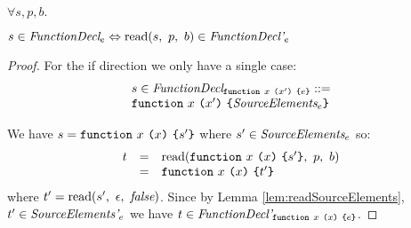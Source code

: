 \documentclass[onecolumn]{sigplanconf-onecolumn}
\begin{document}
\begin{lemma}\mbox{}
  
  \( \forall s, p, b. \)

  \( s \in \textit{FunctionDecl}_{e} \Leftrightarrow 
  \textrm{read}(s,~p,~b) \in \textit{FunctionDecl'}_{e} \)
\end{lemma}
\begin{proof}
  For the if direction we only have a single case: 
  \[ 
  \begin{array}{lcl}
  s \in
  \textit{FunctionDecl}_{\texttt{function}~x~\texttt{(}x'\texttt{)}~\texttt{\{}e\texttt{\}}}
  ::= 
  \\
  \texttt{function}~x~\texttt{(}x'\texttt{)}~\texttt{\{}\textit{SourceElements}_{e}\texttt{\}}
  \end{array}
  \]

 We have \( s = \texttt{function}~x~\texttt{(}x\texttt{)}~\texttt{\{}s'\texttt{\}}
 \) where \( s' \in \textit{SourceElements}_{e} \) so:
 \[
 \begin{array}{rcl}
   t &=& \textrm{read}(\texttt{function}~x~\texttt{(}x\texttt{)}~\texttt{\{}s'\texttt{\}},~p,~b)
   \\
   &=& \texttt{function}~x~\texttt{(}x\texttt{)}~\texttt{\{}t'\texttt{\}}
 \end{array}
 \]
 where \( t' = \textrm{read}(s',~\epsilon,~\textit{false}) \). 
 Since by Lemma \ref{lem:readSourceElements},
 \( t' \in \textit{SourceElements'}_{e} \) we have \( t \in \textit{FunctionDecl'}_{\texttt{function}~x~\texttt{(}x\texttt{)}~\texttt{\{}e\texttt{\}}} \).
\end{proof}
\end{document}
